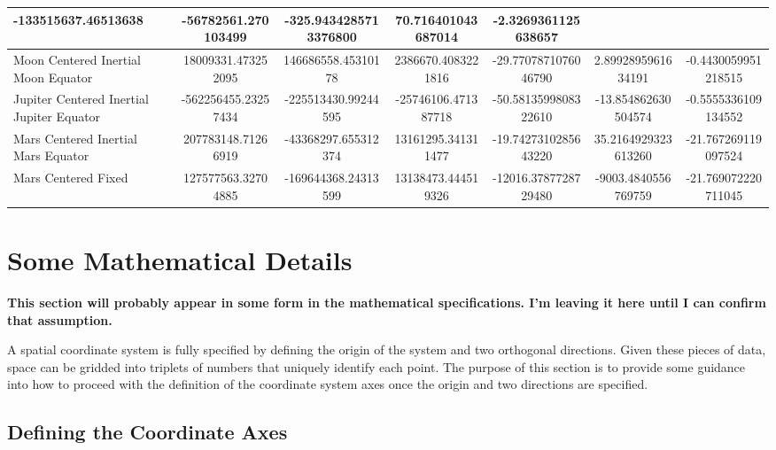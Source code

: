 \begin{table}
{\begin{tabular}{|p{1.25in}|c|c|c|c|c|c|}
{\footnotesize -133515637.46513638}&
{\footnotesize -56782561.270103499}&
{\footnotesize -325.9434285713376800}&
{\footnotesize 70.716401043687014}&
{\footnotesize -2.3269361125638657}\tabularnewline
\hline
{\footnotesize Moon Centered Inertial Moon Equator}&
{\footnotesize 18009331.473252095}&
{\footnotesize 146686558.45310178}&
{\footnotesize 2386670.4083221816}&
{\footnotesize -29.7707871076046790}&
{\footnotesize 2.8992895961634191}&
{\footnotesize -0.4430059951218515}\tabularnewline
\hline
{\footnotesize Jupiter Centered Inertial Jupiter Equator}&
{\footnotesize -562256455.23257434}&
{\footnotesize -225513430.99244595}&
{\footnotesize -25746106.471387718}&
{\footnotesize -50.5813599808322610}&
{\footnotesize -13.854862630504574}&
{\footnotesize -0.5555336109134552}\tabularnewline
\hline
{\footnotesize Mars Centered Inertial Mars Equator}&
{\footnotesize 207783148.71266919}&
{\footnotesize -43368297.655312374}&
{\footnotesize 13161295.341311477}&
{\footnotesize -19.7427310285643220}&
{\footnotesize 35.2164929323613260}&
{\footnotesize -21.767269119097524}\tabularnewline
\hline
{\footnotesize Mars Centered Fixed}&
{\footnotesize 127577563.32704885}&
{\footnotesize -169644368.24313599}&
{\footnotesize 13138473.444519326}&
{\footnotesize -12016.3787728729480}&
{\footnotesize -9003.4840556769759}&
{\footnotesize -21.769072220711045}\tabularnewline
\hline
\end{tabular}
}
\end{table}

\section{Some Mathematical Details}

\textbf{This section will probably appear in some form in the mathematical specifications. I'm
leaving it here until I can confirm that assumption.}

A spatial coordinate system is fully specified by defining the origin of the system and two
orthogonal directions. Given these pieces of data, space can be gridded into triplets of numbers
that uniquely identify each point. The purpose of this section is to provide some guidance into how
to proceed with the definition of the coordinate system axes once the origin and two directions are
specified.

\subsection{Defining the Coordinate Axes}

